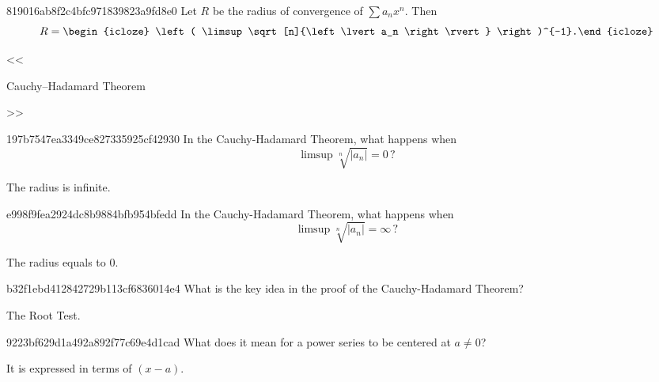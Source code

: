 \begin{note}{819016ab8f2c4bfc971839823a9fd8e0}
    Let \({ R }\) be the radius of convergence of \({ \sum a_n x^{n} }\).
    Then
    \[
        R = \begin{icloze}{1}\left( \limsup \sqrt[n]{\left\lvert a_n \right\rvert} \right)^{-1}.\end{icloze}
    \]

    \begin{center}
        \tiny
        <<\begin{icloze}{2}Cauchy–Hadamard Theorem\end{icloze}>>
    \end{center}
\end{note}

\begin{note}{197b7547ea3349ce827335925cf42930}
    In the Cauchy-Hadamard Theorem, what happens when
    \[
        \limsup \sqrt[n]{\left\lvert a_n \right\rvert} = 0\,?
    \]

    \begin{cloze}{1}
        The radius is infinite.
    \end{cloze}
\end{note}

\begin{note}{e998f9fea2924dc8b9884bfb954bfedd}
    In the Cauchy-Hadamard Theorem, what happens when
    \[
        \limsup \sqrt[n]{\left\lvert a_n \right\rvert} = \infty\,?
    \]

    \begin{cloze}{1}
        The radius equals to \({ 0 }\).
    \end{cloze}
\end{note}

\begin{note}{b32f1ebd412842729b113cf6836014e4}
    What is the key idea in the proof of the Cauchy-Hadamard Theorem?

    \begin{cloze}{1}
        The Root Test.
    \end{cloze}
\end{note}

\begin{note}{9223bf629d1a492a892f77c69e4d1cad}
    What does it mean for a power series to be centered at \({ a \neq 0 }\)?

    \begin{cloze}{1}
        It is expressed in terms of \({ (x - a) }\).
    \end{cloze}
\end{note}

